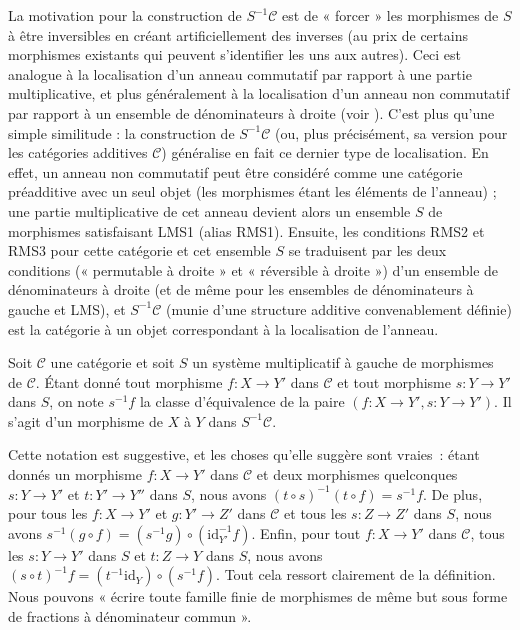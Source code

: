 \begin{remark}
\label{remark-motivation-localization}
La motivation pour la construction de $S^{-1} \mathcal{C}$ est de « forcer »
les morphismes de $S$ à être inversibles en créant artificiellement des
inverses (au prix de certains morphismes existants qui peuvent s'identifier les
uns aux autres). Ceci est analogue à la localisation d'un anneau commutatif
par rapport à une partie multiplicative, et plus généralement à la
localisation d'un anneau non commutatif par rapport à un ensemble de
dénominateurs à droite (voir \cite[Section 10A]{Lam}). C'est plus qu'une simple
similitude : la construction de $S^{-1} \mathcal{C}$ (ou, plus précisément, sa
version pour les catégories additives $\mathcal{C}$) généralise en fait ce
dernier type de localisation. En effet, un anneau non commutatif peut être
considéré comme une catégorie préadditive avec un seul objet (les morphismes
étant les éléments de l'anneau) ; une partie multiplicative de cet anneau
devient alors un ensemble $S$ de morphismes satisfaisant LMS1 (alias RMS1).
Ensuite, les conditions RMS2 et RMS3 pour cette catégorie et cet ensemble
$S$ se traduisent par les deux conditions (« permutable à droite » et
« réversible à droite ») d'un ensemble de dénominateurs à droite (et de même
pour les ensembles de dénominateurs à gauche et LMS), et $S^{-1} \mathcal{C}$
(munie d'une structure additive convenablement définie) est la catégorie à un objet
correspondant à la localisation de l'anneau.
\end{remark}

\begin{definition}
\label{definition-left-localization-as-fraction}
Soit $\mathcal{C}$ une catégorie et soit $S$ un système multiplicatif à gauche
de morphismes de $\mathcal{C}$. Étant donné tout morphisme $f : X \to Y'$ dans
$\mathcal{C}$ et tout morphisme $s : Y \to Y'$ dans $S$, on note {\it $s^{-1} f$} la classe d'équivalence de la paire $(f : X \to Y', s : Y \to Y')$. Il
s'agit d'un morphisme de $X$ à $Y$ dans $S^{-1} \mathcal{C}$.
\end{definition}

\noindent
Cette notation est suggestive, et les choses qu'elle suggère sont vraies :
étant donnés un morphisme $f : X \to Y'$ dans $\mathcal{C}$ et deux
morphismes quelconques $s : Y \to Y'$ et $t : Y' \to Y''$ dans $S$, nous avons
$\left(t \circ s\right)^{-1} \left(t \circ f\right) = s^{-1} f$. De plus, pour
tous les $f : X \to Y'$ et $g : Y' \to Z'$ dans $\mathcal{C}$ et tous les $s : Z \to Z'$ dans $S$, nous avons $s^{-1} \left(g \circ f\right) = \left(s^{-1} g\right) \circ
\left(\text{id}_{Y'}^{-1} f\right)$. Enfin, pour tout $f : X \to Y'$ dans $\mathcal{C}$, tous les $s : Y \to Y'$ dans $S$ et $t : Z \to Y$
dans $S$, nous avons $\left(s \circ t\right)^{-1} f
= \left(t^{-1} \text{id}_Y\right)
\circ \left(s^{-1} f\right)$. Tout cela ressort clairement
de la définition. Nous pouvons « écrire toute famille finie de
morphismes de même but sous forme de fractions à dénominateur commun ».

